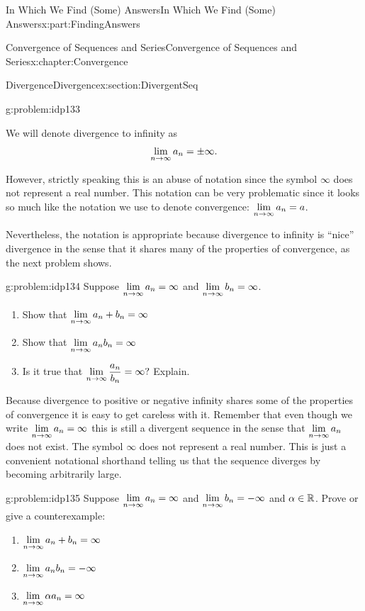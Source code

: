 \begin{partptx}{In Which We Find (Some) Answers}{}{In Which We Find (Some) Answers}{}{}{x:part:FindingAnswers}
\begin{chapterptx}{Convergence of Sequences and Series}{}{Convergence of Sequences and Series}{}{}{x:chapter:Convergence}
\begin{sectionptx}{Divergence}{}{Divergence}{}{}{x:section:DivergentSeq}
\begin{problem}{}{g:problem:idp133}
			\end{problem}
			We will denote divergence to infinity as%
			\begin{equation*}
				{\displaystyle\lim_{n\rightarrow \infty}a_n}=\pm\infty\text{.}
			\end{equation*}
			\par
			However, strictly speaking this is an abuse of notation since the symbol \(\infty\) does not represent a real number. This notation can be very problematic since it looks so much like the notation we use to denote convergence: \({\displaystyle\lim_{n\rightarrow \infty}a_n}=a\).%
			\par
			Nevertheless, the notation is appropriate because divergence to infinity is ``nice'' divergence in the sense that it shares many of the properties of convergence, as the next problem shows.%
			\begin{problem}{}{g:problem:idp134}%
				Suppose \({\displaystyle\lim_{n\rightarrow \infty}a_n}=\infty\) and \({\displaystyle\lim_{n\rightarrow \infty}b_n}=\infty\).%
				\begin{enumerate}[font=\bfseries,label=(\alph*),ref=\alph*]
					\item{}Show that \({\displaystyle\lim_{n\rightarrow \infty}a_n+b_n}=\infty\)%
					\item{}Show that \({\displaystyle\lim_{n\rightarrow \infty}a_nb_n}=\infty\)%
					\item{}Is it true that \({\displaystyle\lim_{n\rightarrow \infty}\frac{a_n}{b_n}}=\infty?\) Explain.%
				\end{enumerate}
			\end{problem}
			Because divergence to positive or negative infinity shares some of the properties of convergence it is easy to get careless with it.  Remember that even though we write \({\displaystyle\lim_{n\rightarrow \infty}a_n}=\infty\) this is still a divergent sequence in the sense that \({\displaystyle\lim_{n\rightarrow \infty}a_n}\) does not exist.  The symbol \(\infty\) does not represent a real number.  This is just a convenient notational shorthand telling us that the sequence diverges by becoming arbitrarily large.%
			\begin{problem}{}{g:problem:idp135}%
				Suppose \({\displaystyle\lim_{n\rightarrow \infty}a_n}=\infty\) and \({\displaystyle\lim_{n\rightarrow \infty}b_n}=-\infty\) and \(\alpha\in\mathbb {R}\).  Prove or give a counterexample:%
				\begin{enumerate}[font=\bfseries,label=(\alph*),ref=\alph*]
					\item{}\({\displaystyle\lim_{n\rightarrow \infty}a_n+b_n}=\infty\)%
					\item{}\({\displaystyle\lim_{n\rightarrow \infty}a_nb_n}=-\infty\)%
					\item{}\({\displaystyle\lim_{n\rightarrow \infty}\alpha a_n}=\infty\)%

\end{enumerate}
\end{problem}
\end{sectionptx}
\end{chapterptx}
\end{partptx}
